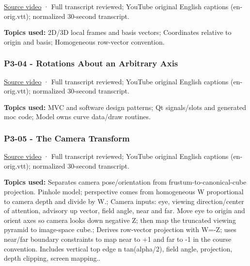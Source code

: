 \href{https://www.youtube.com/watch?v=wArGifkRD2A}{Source video} · Full transcript reviewed; YouTube original English captions (en-orig.vtt); normalized 30-second transcript.

\textbf{Topics used:} 2D/3D local frames and basis vectors; Coordinates relative to origin and basis; Homogeneous row-vector convention.

\subsubsection{P3-04 - Rotations About an Arbitrary Axis}\label{04-visual-computing-ii-ch036-p3-04---rotations-about-an-arbitrary-axis}

\hypertarget{04-visual-computing-ii-ch036-p3-04---rotations-about-an-arbitrary-axis}{}

\href{https://www.youtube.com/watch?v=gRVxv8kWl0Q}{Source video} · Full transcript reviewed; YouTube original English captions (en-orig.vtt); normalized 30-second transcript.

\textbf{Topics used:} MVC and software design patterns; Qt signals/slots and generated moc code; Model owns curve data/draw routines.

\subsubsection{P3-05 - The Camera Transform}\label{04-visual-computing-ii-ch036-p3-05---the-camera-transform}

\hypertarget{04-visual-computing-ii-ch036-p3-05---the-camera-transform}{}

\href{https://www.youtube.com/watch?v=mpTl003EXCY}{Source video} · Full transcript reviewed; YouTube original English captions (en-orig.vtt); normalized 30-second transcript.

\textbf{Topics used:} Separates camera pose/orientation from frustum-to-canonical-cube projection. Pinhole model; perspective comes from homogeneous W proportional to camera depth and divide by W.; Camera inputs: eye, viewing direction/center of attention, advisory up vector, field angle, near and far. Move eye to origin and orient axes so camera looks down negative Z; then map the truncated viewing pyramid to image-space cube.; Derives row-vector projection with W=-Z; uses near/far boundary constraints to map near to +1 and far to -1 in the course convention. Includes vertical top edge n tan(alpha/2), field angle, projection, depth clipping, screen mapping..

